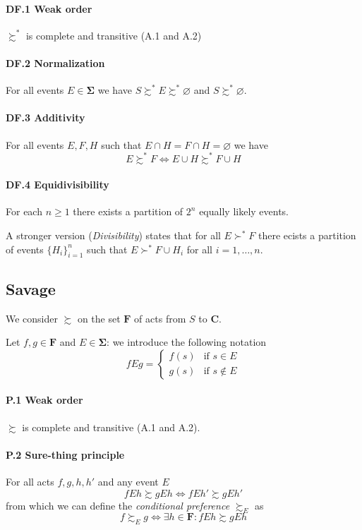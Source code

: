 \documentclass[landscape, 12pt]{extarticle}
\begin{document}
\begin{multicols}{2}
	\paragraph{DF.1 Weak order}
	$\succsim^*$ is complete and transitive (A.1 and A.2)

	\paragraph{DF.2 Normalization}
	For all events $E \in \bm \Sigma$
	we have $S \succsim^* E \succsim^* \varnothing$
	and $S \succsim^* \varnothing$.

	\paragraph{DF.3 Additivity}
	For all events $E, F, H$ such that $E \cap H = F \cap H = \varnothing$ we have
	\[
		E \succsim^* F \iff E \cup H \succsim^* F \cup H
	\]

	\paragraph{DF.4 Equidivisibility}
	For each $n \geq 1$ there exists a partition of $2^n$ equally likely events.

	A stronger version (\textit{Divisibility}) states that for all $E \succ^* F$ there ecists
	a partition of events $\{H_i\}^n_{i = 1}$
	such that $E \succ^* F \cup H_i$ for all $i = 1, \dots, n$.

	\subsection{Savage}
	We consider $\succsim$ on the set $\bm F$ of acts from $S$ to $\bm C$.

	Let $f, g \in \bm F$ and $E \in \bm \Sigma$: we introduce the following notation
	\[
		fEg = \begin{cases}
			f(s) & \text{if } s \in E    \\
			g(s) & \text{if } s \notin E
		\end{cases}
	\]

	\paragraph{P.1 Weak order}
	$\succsim$ is complete and transitive (A.1 and A.2).

	\paragraph{P.2 Sure-thing principle}
	For all acts $f, g, h, h'$ and any event $E$
	\[
		fEh \succsim gEh \iff fEh' \succsim gEh'
	\]
	from which we can define the \textit{conditional preference} $\succsim_E$ as
	\[
		f \succsim_E g \iff \exists h \in \bm F : f E h \succsim gEh
	\]


\end{multicols}
\end{document}
